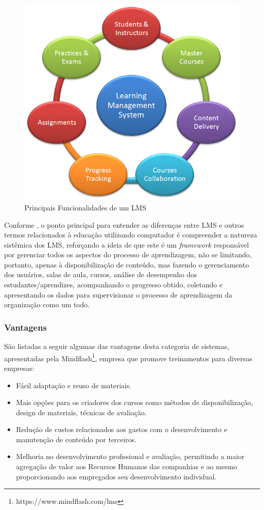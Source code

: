\documentclass[12pt]{article}
\begin{document}
\begin{figure}[ht]
\centering
\includegraphics[width=.5\textwidth]{lmscloud.png}
\caption{Principais Funcionalidades de um LMS}
\end{figure}


Conforme \cite{watson2007learning}, o ponto principal para entender as diferenças entre LMS e outros termos relacionados à educação utilizando 
computador é compreender a natureza sistêmica dos LMS, reforçando a ideia de que este é um \textit{framework} responsável por gerenciar todos 
os aspectos do processo de aprendizagem, não se limitando, portanto, apenas à disponibilização de conteúdo, mas fazendo o gerenciamento dos 
usuários, salas de aula, cursos, análise de desempenho dos estudantes/aprendizes, acompanhando o progresso obtido, coletando e apresentando os 
dados para supervisionar o processo de aprendizagem da organização como um todo.

\subsubsection{Vantagens}

São listadas a seguir algumas das vantagens desta categoria de sistemas, apresentadas pela Mindflash\footnote{https://www.mindflash.com/lms}, 
empresa que promove treinamentos para diversas empresas:

\begin{itemize}
 \setlength\itemsep{0.5em}
 \item Fácil adaptação e reuso de materiais.
 \item Mais opções para os criadores dos cursos como métodos de disponibilização, design de materiais, técnicas de avaliação.
 \item Redução de custos relacionados aos gastos com o desenvolvimento e manutenção de conteúdo por terceiros.
 \item Melhoria no desenvolvimento profissional e avaliação, permitindo a maior agregação de valor aos Recursos Humanos das companhias e ao mesmo 
 proporcionando aos empregados seu desenvolvimento individual.
\end{itemize}
\end{document}
